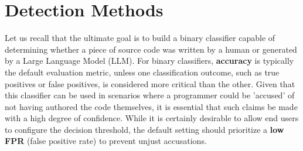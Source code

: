 \chapter{Detection Methods}
Let us recall that the ultimate goal is to build a binary classifier capable of determining whether a piece of source code was written by a human or generated by a Large Language Model (LLM). For binary classifiers, \textbf{accuracy} is typically the default evaluation metric, unless one classification outcome, such as true positives or false positives, is considered more critical than the other. Given that this classifier can be used in scenarios where a programmer could be 'accused' of not having authored the code themselves, it is essential that such claims be made with a high degree of confidence. While it is certainly desirable to allow end users to configure the decision threshold, the default setting should prioritize a \textbf{low FPR} (false positive rate) to prevent unjust accusations.


